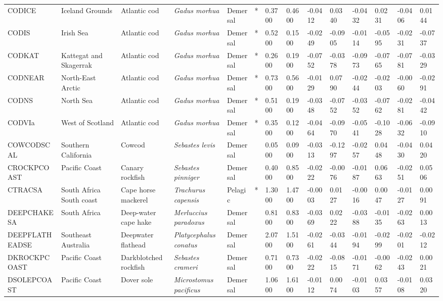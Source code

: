 \begin{longtable}{p{2.6cm}p{1.9cm}p{1.7cm}p{1.6cm}p{1cm}p{0.3cm}p{1cm}p{1cm}p{1cm}p{1.1cm}p{1cm}p{1.1cm}p{1cm}p{1.1cm}}
  CODICE & Iceland Grounds & Atlantic cod & \textit{Gadus morhua} & Demersal & * & 0.3700 & 0.4600 & -0.0412 & 0.0340 & -0.0432 & 0.0231 & -0.0406 & 0.0144 \\ 
  CODIS & Irish Sea & Atlantic cod & \textit{Gadus morhua} & Demersal & * & 0.5200 & 0.1500 & -0.0249 & -0.0905 & -0.0114 & -0.0595 & -0.0231 & -0.0737 \\ 
  CODKAT & Kattegat and Skagerrak & Atlantic cod & \textit{Gadus morhua} & Demersal & * & 0.2600 & 0.1900 & -0.0752 & -0.0378 & -0.0973 & -0.0765 & -0.0781 & -0.0329 \\ 
  CODNEAR & North-East Arctic & Atlantic cod & \textit{Gadus morhua} & Demersal & * & 0.7300 & 0.5600 & -0.0129 & 0.0790 & -0.0244 & -0.0203 & -0.0060 & -0.0291 \\ 
  CODNS & North Sea & Atlantic cod & \textit{Gadus morhua} & Demersal & * & 0.5100 & 0.1900 & -0.0348 & -0.0752 & -0.0352 & -0.0762 & -0.0281 & -0.0442 \\ 
  CODVIa & West of Scotland & Atlantic cod & \textit{Gadus morhua} & Demersal & * & 0.3500 & 0.1200 & -0.0464 & -0.0970 & -0.0541 & -0.1028 & -0.0632 & -0.0910 \\ 
  COWCODSCAL & Southern California & Cowcod & \textit{Sebastes levis} & Demersal &   & 0.0500 & 0.0900 & -0.0313 & -0.1297 & -0.0257 & 0.0448 & -0.0430 & 0.0420 \\ 
  CROCKPCOAST & Pacific Coast & Canary rockfish & \textit{Sebastes pinniger} & Demersal &   & 0.4000 & 0.8500 & -0.0222 & -0.0076 & -0.0187 & 0.0663 & -0.0251 & 0.0506 \\ 
  CTRACSA & South Africa South coast & Cape horse mackerel & \textit{Trachurus capensis} & Pelagic & * & 1.3000 & 1.4700 & -0.0003 & 0.0127 & -0.0016 & 0.0047 & -0.0127 & 0.0091 \\ 
  DEEPCHAKESA & South Africa & Deep-water cape hake & \textit{Merluccius paradoxus} & Demersal &   & 0.8100 & 0.8300 & -0.0369 & 0.0222 & -0.0388 & -0.0135 & -0.0263 & 0.0013 \\ 
  DEEPFLATHEADSE & Southeast Australia & Deepwater flathead & \textit{Platycephalus conatus} & Demersal &   & 2.0700 & 1.5100 & -0.0261 & -0.0344 & -0.0194 & -0.0299 & -0.0201 & -0.0212 \\ 
  DKROCKPCOAST & Pacific Coast & Darkblotched rockfish & \textit{Sebastes crameri} & Demersal &   & 0.7100 & 0.7300 & -0.0222 & -0.0815 & -0.0171 & -0.0062 & -0.0243 & 0.0021 \\ 
  DSOLEPCOAST & Pacific Coast & Dover sole & \textit{Microstomus pacificus} & Demersal &   & 1.0600 & 1.6100 & -0.0112 & 0.0074 & -0.0103 & 0.0357 & -0.0108 & 0.0320 \\ 

\end{longtable}
